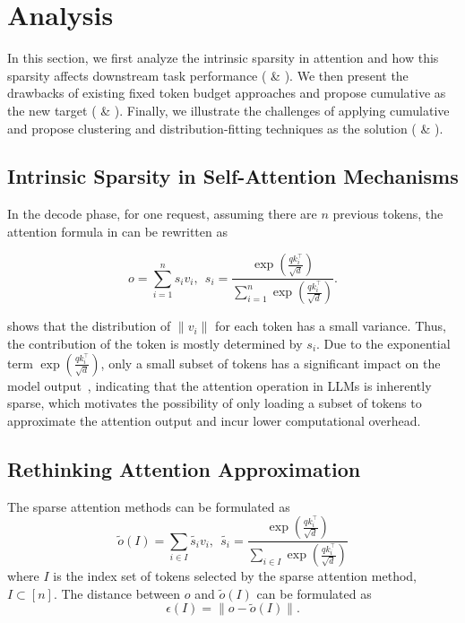 \section{Analysis}


In this section, we first analyze the intrinsic sparsity in attention and how this sparsity affects downstream task performance ( \& ).
We then present the drawbacks of existing fixed token budget approaches and propose cumulative \as{} as the new target ( \& ).
Finally, we illustrate the challenges of applying cumulative \as{} and propose clustering and distribution-fitting techniques as the solution ( \& ).


\subsection{Intrinsic Sparsity in Self-Attention Mechanisms}
\label{subsec:analysis-intrinsic-sparsity}

In the decode phase, for one request, assuming there are $n$ previous tokens, the attention formula in   can be rewritten as

\begin{equation}
    o = \sum_{i=1}^{n}s_iv_i,~~s_i=\frac{\exp(\frac{qk_i^\top}{\sqrt{d}})}{\sum_{i=1}^{n}\exp(\frac{qk_i^\top}{\sqrt{d}})}.
\end{equation}

 shows that the distribution of $\|v_i\|$ for each token has a small variance. Thus, the contribution of the token is mostly determined by $s_i$. 
Due to the exponential term $\exp(\frac{qk_i^\top}{\sqrt{d}})$, only a small subset of tokens has a significant impact on the model output~\cite{zhang2023h2o,xiao2023streamingllm}, indicating that the attention operation in LLMs is inherently sparse, which motivates the possibility of only loading a subset of tokens to approximate the attention output and incur lower computational overhead. 



\subsection{Rethinking Attention Approximation}
\label{subsec:analysis-attn-approx}
The sparse attention methods can be formulated as
\begin{equation}
    \tilde{o}(I) =  \sum_{i\in I}\tilde{s_i}v_i,~~\tilde{s_i}=\frac{\exp(\frac{qk_i^\top}{\sqrt{d}})}{\sum_{i\in I}\exp(\frac{qk_i^\top}{\sqrt{d}})}
\end{equation}
where $I$ is the index set of tokens selected by the sparse attention method, $I\subset[n]$. The distance between $o$ and $\tilde{o}(I)$ can be formulated as 
\begin{equation}
    \epsilon(I)=\|o-\tilde{o}(I)\|.
\end{equation}

